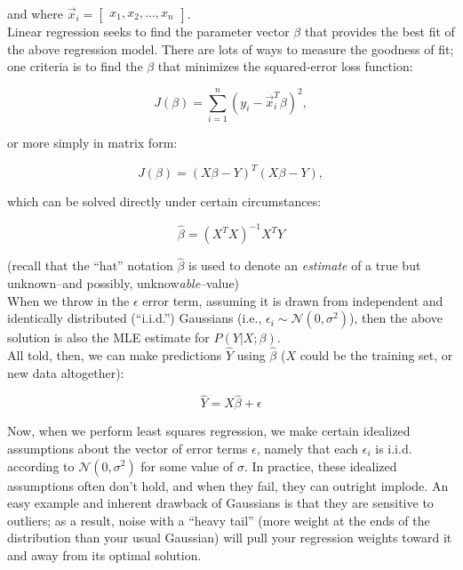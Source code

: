 \documentclass[paper=a4, fontsize=11pt]{scrartcl} %
\numberwithin{figure}{section} %
\numberwithin{table}{section} %
\begin{document}
and where $\vec{x}_i = \begin{bmatrix}x_1, x_2, ..., x_n\end{bmatrix}$. \\

Linear regression seeks to find the parameter vector $\beta$ that provides the best fit of the above regression model. There are lots of ways to measure the goodness of fit; one criteria is to find the $\beta$ that minimizes the squared-error loss function:

$$
J(\beta) = \sum_{i = 1}^n (y_i - \vec{x}_i^T \beta)^2,
$$

or more simply in matrix form:

\begin{equation}
J(\beta) = (X\beta - Y)^T (X\beta - Y),
\label{eq:sqerr}
\end{equation}

which can be solved directly under certain circumstances:

\begin{equation}
\hat{\beta} = (X^TX)^{-1} X^TY
\label{eq:dirsol}
\end{equation}

(recall that the ``hat'' notation $\hat{\beta}$ is used to denote an \emph{estimate} of a true but unknown--and possibly, unknow\emph{able}--value) \\

When we throw in the $\epsilon$ error term, assuming it is drawn from independent and identically distributed (``i.i.d.'') Gaussians (i.e., $\epsilon_i \sim \mathcal{N}(0, \sigma^2)$), then the above solution is also the MLE estimate for $P(Y | X; \beta)$. \\

All told, then, we can make predictions $\hat{Y}$ using $\hat{\beta}$ ($X$ could be the training set, or new data altogether):

$$
\hat{Y} = X\hat{\beta} + \epsilon
$$

Now, when we perform least squares regression, we make certain idealized assumptions about the vector of error terms $\epsilon$, namely that each $\epsilon_i$ is i.i.d. according to $\mathcal{N}(0, \sigma^2)$ for some value of $\sigma$. In practice, these idealized assumptions often don't hold, and when they fail, they can outright implode. An easy example and inherent drawback of Gaussians is that they are sensitive to outliers; as a result, noise with a ``heavy tail'' (more weight at the ends of the distribution than your usual Gaussian) will pull your regression weights toward it and away from its optimal solution. \\
\end{document}
